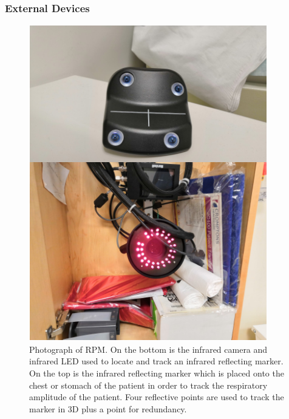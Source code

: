             \subsubsection{External Devices} \label{sec:external_devices}
                \begin{figure}
                    \centering
                        
                    \includegraphics[width=1.0\linewidth]{figures/background_rpm.png}
                        
                    \captionsetup{singlelinecheck=false, justification=raggedright}
                    \caption{Photograph of \gls{RPM}. On the bottom is the infrared camera and infrared \gls{LED} used to locate and track an infrared reflecting marker. On the top is the infrared reflecting marker which is placed onto the chest or stomach of the patient in order to track the respiratory amplitude of the patient. Four reflective points are used to track the marker in \gls{3D} plus a point for redundancy.} \label{fig:external_devices_rpm}
                \end{figure}
                
